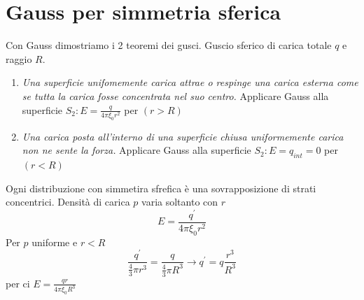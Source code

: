 \documentclass{book}
\begin{document}
\section{Gauss per simmetria sferica}
Con Gauss dimostriamo i 2 teoremi dei gusci. Guscio sferico di carica totale $q$ e raggio $R$.
\begin{enumerate}
\item \textit{Una superficie unifomemente carica attrae o respinge una carica esterna come se tutta la carica fosse concentrata nel suo centro.} Applicare Gauss alla superficie $S_2: E=\frac{q}{4\pi \xi_0 r^2}$ per $(r>R)$
  \item \textit{Una carica posta all'interno di una superficie chiusa uniformemente carica non ne sente la forza.} Applicare Gauss alla superficie $S_2: E=q_{int}=0$ per $(r<R)$
\end{enumerate}
Ogni distribuzione con simmetira sfrefica è una sovrapposizione di strati concentrici. Densità di carica $p$ varia soltanto con $r$
\begin{equation}
  E=\frac{q^\prime}{4\pi\xi_0r^2}
\end{equation}
Per $p$ uniforme e $r<R$
\begin{equation}
  	\frac{q^\prime}{\frac{4}{3}\pi r^3}=\frac{q}{\frac{4}{3}\pi R^3}\to q^\prime=q\frac{r^3}{R^3}
\end{equation}
per ci $E=\frac{qr}{4\pi \xi_0 R^3}$
\end{document}
